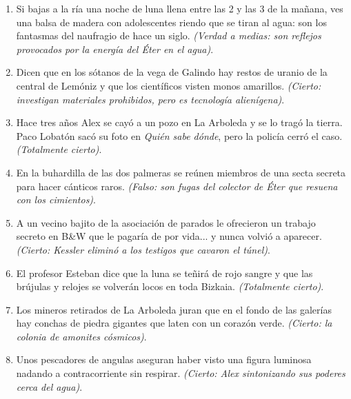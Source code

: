 \begin{enumerate}[label=\textbf{\arabic*.}]
  \item {} Si bajas a la ría una noche de luna llena entre las 2 y las 3 de la mañana, ves una balsa de madera con adolescentes riendo que se tiran al agua: son los fantasmas del naufragio de hace un siglo. \emph{(Verdad a medias: son reflejos provocados por la energía del Éter en el agua)}.
  \item {} Dicen que en los sótanos de la vega de Galindo hay restos de uranio de la central de Lemóniz y que los científicos visten monos amarillos. \emph{(Cierto: investigan materiales prohibidos, pero es tecnología alienígena)}.
  \item {} Hace tres años Alex se cayó a un pozo en La Arboleda y se lo tragó la tierra. Paco Lobatón sacó su foto en \emph{Quién sabe dónde}, pero la policía cerró el caso. \emph{(Totalmente cierto)}.
  \item {} En la buhardilla de las dos palmeras se reúnen miembros de una secta secreta para hacer cánticos raros. \emph{(Falso: son fugas del colector de Éter que resuena con los cimientos)}.
  \item {} A un vecino bajito de la asociación de parados le ofrecieron un trabajo secreto en B\&W que le pagaría de por vida... y nunca volvió a aparecer. \emph{(Cierto: Kessler eliminó a los testigos que cavaron el túnel)}.
  \item {} El profesor Esteban dice que la luna se teñirá de rojo sangre y que las brújulas y relojes se volverán locos en toda Bizkaia. \emph{(Totalmente cierto)}.
  \item {} Los mineros retirados de La Arboleda juran que en el fondo de las galerías hay conchas de piedra gigantes que laten con un corazón verde. \emph{(Cierto: la colonia de amonites cósmicos)}.
  \item {} Unos pescadores de angulas aseguran haber visto una figura luminosa nadando a contracorriente sin respirar. \emph{(Cierto: Alex sintonizando sus poderes cerca del agua)}.
\end{enumerate}
